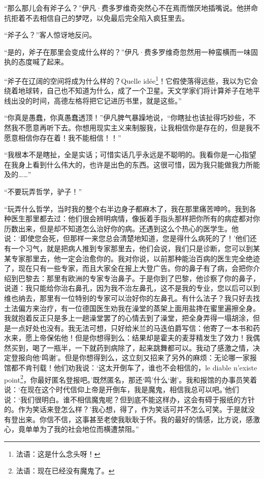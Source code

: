 \par “那么那儿会有斧子么？”伊凡·费多罗维奇突然心不在焉而憎厌地插嘴说。他拼命抗拒着不去相信自己的梦呓，以免最后完全陷入疯狂里去。
\par “斧子么？”客人惊讶地反问。
\par “是的，斧子在那里会变成什么样的？”伊凡·费多罗维奇忽然用一种蛮横而一味固执的态度喊了起来。
\par “斧子在辽阔的空间将成为什么样的？Quelle idée\footnote{法语：这是什么念头呀！}！它假使落得远些，我以为它会绕着地球转，自己也不知道为什么，成了一个卫星。天文学家们将计算斧子在地平线出没的时间，高德左格将把它记进历书里，就是这些。”
\par “你真是愚蠢，你真愚蠢透顶！”伊凡脾气暴躁地说，“你瞎扯也该扯得巧妙些，不然我不愿意再听下去。你想用现实主义来制服我，让我相信你是存在的，但是我不愿意相信你存在着！我不能相信！！”
\par “我根本不是瞎扯，全是实话；可惜实话几乎永远是不聪明的。我看你是一心指望在我身上看到什么伟大的，也许是出色的东西。这很可惜，因为我只能做我力所能及的……”
\par “不要玩弄哲学，驴子！”
\par “玩弄什么哲学，当时我的整个右半边身子都麻木了，我在那里痛苦呻吟。我到各种医生那里都去过：他们很会辨明病情，像扳着手指头那样把你所有的病症都对你历数出来，但是却不知道怎么治好你的病。还遇到这么个热心的医学生。他说：‘即使您会死，但那样一来您总会清楚地知道，您是得什么病死的了！’他们还有一个习气，就是把病人推到专家那里去，他们会说，我们只是诊断，您可以到某某专家那里去，他一定会治愈你的。我对你说，以前那种能治百病的医生完全绝迹了，现在只有一些专家，而且大家全在报上大登广告。你的鼻子有了病，会把你介绍到巴黎去：那里有欧洲的专家专治鼻子。于是你到了巴黎，他诊察了你的鼻子，说道：我只能给你治右鼻孔，因为我不治左鼻孔，这不是我的专业，您以后可以到维也纳去，那里有一位特别的专家可以治好你的左鼻孔。有什么法子？我只好去找土法偏方来治疗，有一位德国医生劝我在澡堂的蒸架上面用盐搀在蜜里遍擦全身。我就抱着反正只是多上一趟澡堂罢了的心情去到了澡堂，把全身弄得一塌胡涂，但是一点好处也没有。我无法可想，只好给米兰的马迭伯爵写信：他寄了一本书和药水来，愿上帝保佑他！但是你想得到么：结果却是霍夫的麦芽精发生了效力！我偶然买到，喝了一瓶半，一下就药到病除了，起来跳舞都可以。我动了感激之情，决定登报向他‘鸣谢’。但是你想得到么，这立刻又招来了另外的麻烦：无论哪一家报馆都不肯刊载！他们劝我说：‘这太开倒车了，谁也不会相信的，le diable n’existe point\footnote{法语：现在已经没有魔鬼了。}，你最好匿名登报吧。’既然匿名，那还‘鸣’什么‘谢’。我和报馆的办事员笑着说：‘在现在这个时代信仰上帝是开倒车，我是魔鬼，相信我总可以吧。’他们说：‘我们很明白。谁不相信魔鬼呢？但到底不能这样办，这会有碍于报纸的方针的。作为笑话来登怎么样？’我心想，得了，作为笑话可并不怎么可笑。于是就没有登出来。你信不信，这事甚至老使我耿耿于怀。我的最好的情感，比方说，感激心，竟单单为了我的社会地位而横遭禁阻。”
